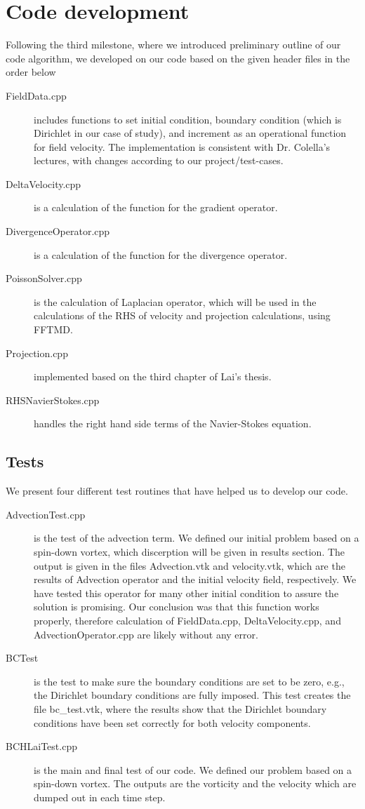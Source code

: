 \documentclass{article}
\begin{document}
\section{Code development}

Following the third milestone, where we introduced preliminary outline of our code algorithm, we developed on our code based on the given header files in the order below
\begin{description}
	\item[FieldData.cpp] includes functions to set initial condition, boundary condition (which is Dirichlet in our case of study), and increment as an operational function for field velocity. The implementation is consistent with Dr. Colella's lectures, with changes according to our project/test-cases.
	\item[DeltaVelocity.cpp] is a calculation of the function for the gradient operator. 
	\item[DivergenceOperator.cpp] is a calculation of the function for the divergence operator. 
	\item[PoissonSolver.cpp] is the calculation of Laplacian operator, which will be used in the calculations of the RHS of velocity and projection calculations, using FFTMD.
	\item [Projection.cpp] implemented based on the third chapter of Lai's thesis\cite{Lai1993a}.
	\item [RHSNavierStokes.cpp] handles the right hand side terms of the Navier-Stokes equation.
\end{description}

\subsection{Tests}
We present four different test routines that have helped us to develop our code.
\begin{description}
	\item[AdvectionTest.cpp] is the test of the advection term. We defined our initial problem based on a spin-down vortex, which discerption will be given in results section. The output is given in the files Advection.vtk and velocity.vtk, which are the results of Advection operator and the initial velocity field, respectively. We have tested this operator for many other initial condition to assure the solution is promising. Our conclusion was that this function works properly, therefore calculation of FieldData.cpp, DeltaVelocity.cpp, and AdvectionOperator.cpp are likely without any error.
	\item[BCTest] is the test to make sure the boundary conditions are set to be zero, e.g., the Dirichlet boundary conditions are fully imposed. This test creates the file bc_test.vtk, where the results show that the Dirichlet boundary conditions have been set correctly for both velocity components.
	\item[BCHLaiTest.cpp] is the main and final test of our code. We defined our problem based on a spin-down vortex\cite{howel1997}. The outputs are the vorticity and the velocity which are dumped out in each time step.


\end{description}
\end{document}
